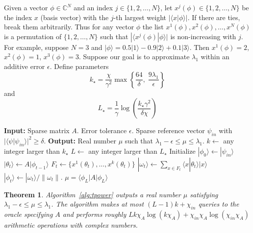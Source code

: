 \documentclass[
  reprint,            %
  amsmath,amssymb,
  aps,
  superscriptaddress, %
  longbibliography
]{revtex4-2}
\newtheorem{theorem}{Theorem}
\theoremstyle{definition}
\newcommand{\CC}{\mathbb{C}}
\newcommand{\la}{\langle}
\newcommand{\ra}{\rangle}
\begin{document}
Given a vector $\phi \in \CC^N$ and an index $j\in \{1,2,\ldots,N\}$, let $x^j(\phi) \in \{1,2,\ldots,N\}$ be the index $x$ (basis vector)
with the $j$-th  largest 
weight $|\la x|\phi\ra|$. If there are  ties, break them arbitrarily.
Thus for any vector $\phi$ the list $x^1(\phi),x^2(\phi),\ldots,x^N(\phi)$ is a permutation of  $\{1,2,\ldots,N\}$ 
such that $|\la x^j(\phi)|\phi\ra|$ is non-increasing with $j$.
For example, suppose $N=3$ and $|\phi\ra =0.5|1\ra - 0.9|2\ra + 0.1|3\ra$. Then $x^1(\phi)=2$, $x^2(\phi)=1$, $x^3(\phi)=3$.
Suppose our goal is to approximate $\lambda_1$ within an additive error $\epsilon$.
Define parameters
\begin{equation}
\label{eq:kstar}
    k_\star  =
     \frac{\chi}{\gamma^2} 
    \max{\left\{
    \frac{64}{\delta},
    \;
    \frac{9\lambda_1}{\epsilon}
    \right\}}
\end{equation}
and
\[
L_\star = \frac1{\gamma}\log{\left( \frac{k_\star  \gamma^2}{\delta \chi} \right)}
\]
\begin{algorithm}[H]
\caption{Truncated Power Method~\cite{yuan2013truncated}} 
\label{alg:tpower}
\begin{algorithmic}[1]  
\State \textbf{Input:} Sparse matrix $A$. Error tolerance $\epsilon$.  Sparse reference vector $\psi_{in}$ with  $|\la \psi|\psi_{in}\ra|^2\ge \delta$. 
\State \textbf{Output:} Real number $\mu$ such that $\lambda_1-\epsilon\le \mu\le \lambda_1$. 
\State $k \gets$ any integer larger than  $k_\star$ 
\State $L \gets$ any integer larger than  $L_\star$ 
\State Initialize $|\phi_0\ra \gets |\psi_{in}\ra$
\State $|\theta_t\ra \gets A|\phi_{t-1}\ra$ 
\State $F_t\gets \{x^1(\theta_t), \ldots,x^k(\theta_t)\}$ 
\State $|\omega_t\ra \gets \sum_{x\in F_t} \la x|\theta_t\ra |x\ra$  
\State $|\phi_t\ra \gets |\omega_t\ra/\| \omega_t\|$. 
\EndFor
\State \Return $\mu=\la \phi_L|A|\phi_L\ra$
\end{algorithmic}
\end{algorithm}




\begin{theorem}
\label{thm:tpower}
Algorithm~\ref{alg:tpower} outputs a real number $\mu$ satisfying 
$\lambda_1-\epsilon\le \mu\le\lambda_1$.
The algorithm makes at most $(L-1)k+\chi_{in}$ queries to the oracle specifying $A$
and performs roughly
$Lk\chi_A \log{(k\chi_A)} + \chi_{in}\chi_A \log{(\chi_{in} \chi_A)}$
arithmetic operations with complex numbers.
\end{theorem}
\end{document}
